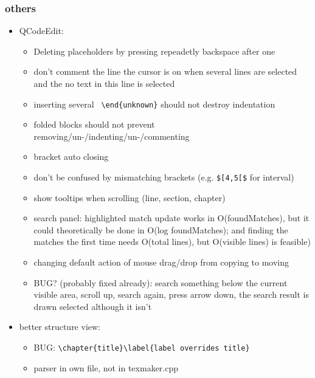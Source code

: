 \documentclass[10pt,a4paper,landscape]{report}
\begin{document}
\subsubsection{others}
\begin{itemize}
	\item QCodeEdit: \begin{itemize}
		\item Deleting placeholders by pressing repeadetly backspace after one
		\item don't comment the line the cursor is on when several lines are selected and the no text in this line is selected
		\item %
		inserting several \verb+ \end{unknown}+ should not destroy indentation
		\item folded blocks should not prevent removing/un-/indenting/un-/commenting
		\item bracket auto closing
		\item don't be confused by mismatching brackets (e.g. \verb+$[4,5[$+ for interval)
%
%
%
%
		\item show tooltips when scrolling (line, section, chapter)
		\item search panel: highlighted match update works in O(foundMatches), but it could theoretically be done in O(log foundMatches);
		and finding the matches the first time needs O(total lines), but O(visible lines) is feasible)
		\item changing default action of mouse drag/drop from copying to moving
		\item BUG? (probably fixed already): 
		search something below the current visible area, scroll up, search again, press arrow down, the search result is drawn selected although it isn't
	\end{itemize}
	\item better structure view: \begin{itemize}
		\item BUG: \verb+\chapter{title}\label{label overrides title}+
		\item parser in own file, not in texmaker.cpp

\end{itemize}
\end{itemize}
\end{document}
